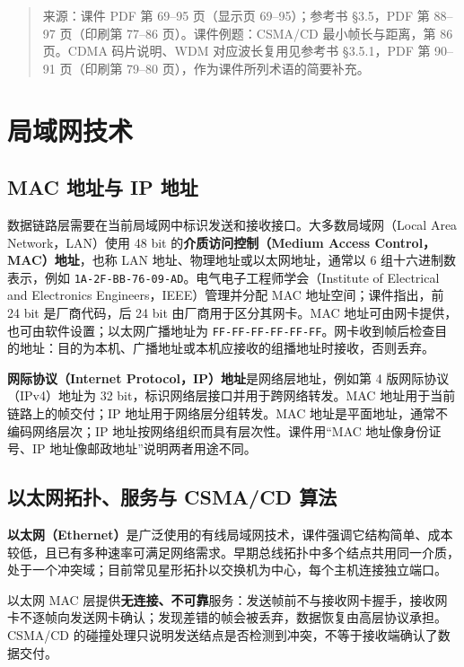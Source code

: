 
\begin{quote}\small 来源：课件 PDF 第 69--95 页（显示页 69--95）；参考书 §3.5，PDF 第 88--97 页（印刷第 77--86 页）。课件例题：CSMA/CD 最小帧长与距离，第 86 页。CDMA 码片说明、WDM 对应波长复用见参考书 §3.5.1，PDF 第 90--91 页（印刷第 79--80 页），作为课件所列术语的简要补充。\end{quote}

\section{局域网技术}

\subsection{MAC 地址与 IP 地址}
数据链路层需要在当前局域网中标识发送和接收接口。大多数局域网（Local Area Network，LAN）使用 48 bit 的\textbf{介质访问控制（Medium Access Control，MAC）地址}，也称 LAN 地址、物理地址或以太网地址，通常以 6 组十六进制数表示，例如 \texttt{1A-2F-BB-76-09-AD}。电气电子工程师学会（Institute of Electrical and Electronics Engineers，IEEE）管理并分配 MAC 地址空间；课件指出，前 24 bit 是厂商代码，后 24 bit 由厂商用于区分其网卡。MAC 地址可由网卡提供，也可由软件设置；以太网广播地址为 \texttt{FF-FF-FF-FF-FF-FF}。网卡收到帧后检查目的地址：目的为本机、广播地址或本机应接收的组播地址时接收，否则丢弃。

\textbf{网际协议（Internet Protocol，IP）地址}是网络层地址，例如第 4 版网际协议（IPv4）地址为 32 bit，标识网络层接口并用于跨网络转发。MAC 地址用于当前链路上的帧交付；IP 地址用于网络层分组转发。MAC 地址是平面地址，通常不编码网络层次；IP 地址按网络组织而具有层次性。课件用“MAC 地址像身份证号、IP 地址像邮政地址”说明两者用途不同。


\subsection{以太网拓扑、服务与 CSMA/CD 算法}
\textbf{以太网（Ethernet）}是广泛使用的有线局域网技术，课件强调它结构简单、成本较低，且已有多种速率可满足网络需求。早期总线拓扑中多个结点共用同一介质，处于一个冲突域；目前常见星形拓扑以交换机为中心，每个主机连接独立端口。

以太网 MAC 层提供\textbf{无连接、不可靠}服务：发送帧前不与接收网卡握手，接收网卡不逐帧向发送网卡确认；发现差错的帧会被丢弃，数据恢复由高层协议承担。CSMA/CD 的碰撞处理只说明发送结点是否检测到冲突，不等于接收端确认了数据交付。

